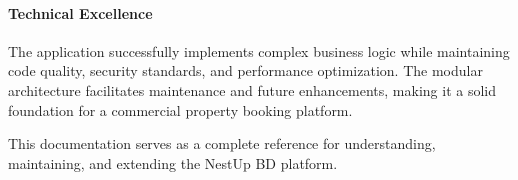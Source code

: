 \documentclass[12pt,a4paper]{article}
\begin{document}
\paragraph{Technical Excellence}
The application successfully implements complex business logic while maintaining code quality, security standards, and performance optimization. The modular architecture facilitates maintenance and future enhancements, making it a solid foundation for a commercial property booking platform.

This documentation serves as a complete reference for understanding,
maintaining, and extending the NestUp BD platform.
\end{document}
